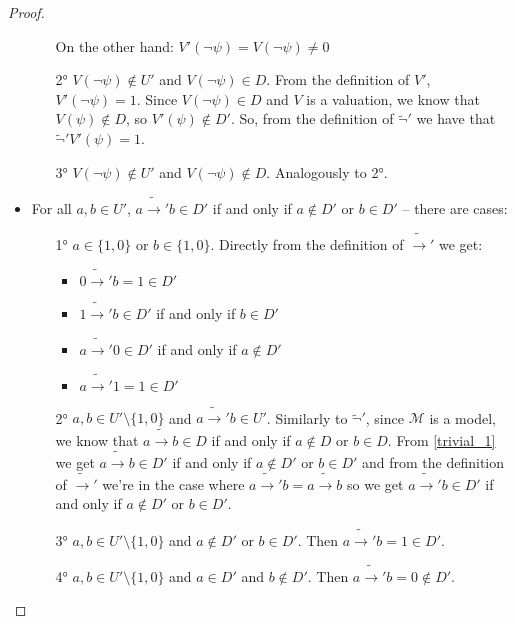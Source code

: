 \documentclass{article}
\theoremstyle{definition}
\theoremstyle{definition}
\theoremstyle{definition}
\newcommand*{\ra}{\rightarrow}
\begin{document}
\begin{proof}
\begin{itemize}
\begin{enumerate}
{\begin{enumerate}
                    On the other hand: $V'(\lnot \psi) = V(\lnot \psi) \not = 0$
                  \end{enumerate}
                  }
                  \item[2°] $V(\lnot \psi) \not \in U'$ and $V(\lnot \psi) \in D$. From the definition of $V'$, $V'(\lnot \psi) = 1$. Since $V(\lnot \psi) \in D$ and $V$ is a valuation, we know that $V(\psi) \not \in D$, so $V'(\psi) \not \in D'$. So, from the definition of $\tilde{\lnot}'$ we have that $\tilde{\lnot}'V'(\psi) = 1$.
                  \item[3°] $V(\lnot \psi) \not \in U'$ and $V(\lnot \psi) \not \in D$. Analogously to 2°.
              \end{enumerate}
        \item For all $a, b \in U'$, $a \tilde{\ra}'b \in D'$ if and only if $a \not \in D'$
              or $b \in D'$ -- there are cases:
              \begin{enumerate}
                  \item[1°] $a \in \{1, 0\}$ or $b \in \{1, 0\}$. Directly from the definition of $\tilde{\ra}'$ we get:
                      \begin{itemize}
                          \item $0 \tilde{\ra}' b = 1 \in D'$
                          \item $1 \tilde{\ra}' b \in D'$ if and only if $b \in D'$
                          \item $a \tilde{\ra}' 0 \in D'$ if and only if $a \not \in D'$
                          \item $a \tilde{\ra}' 1 = 1 \in D'$
                      \end{itemize}
                  \item[2°] $a, b \in U' \setminus \{1, 0\}$ and $a \tilde{\ra}' b \in U'$. Similarly to $\tilde{\lnot}'$, since $\mathcal{M}$ is a model, we know that $a \tilde{\ra} b \in D$ if and only if $a \not \in D$ or $b \in D$. From \cref{trivial_1} we get $a \tilde{\ra} b \in D'$ if and only if $a \not \in D'$ or $b \in D'$ and from the definition of $\tilde{\ra}'$ we're in the case where $a \tilde{\ra}'b = a \tilde{\ra} b$ so we get $a \tilde{\ra}' b \in D'$ if and only if $a \not \in D'$ or $b \in D'$.
                  \item[3°] $a, b \in U' \setminus \{1, 0\}$ and $a \not \in D'$ or $b \in D'$. Then $a \tilde{\ra}' b = 1 \in D'$.
                  \item[4°] $a, b \in U' \setminus \{1, 0\}$ and $a \in D'$ and $b \not \in D'$. Then $a \tilde{\ra}' b = 0 \not \in D'$.


\end{enumerate}
\end{itemize}
\end{proof}
\end{document}
